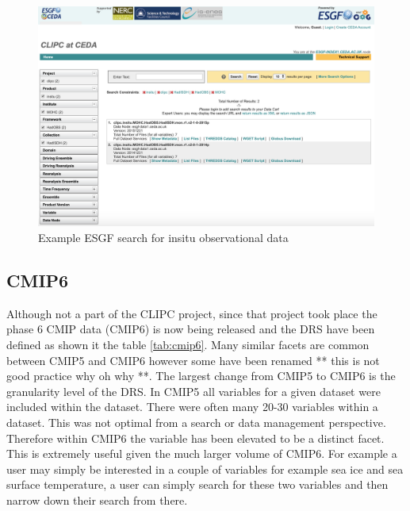\documentclass[final,1p,times,twocolumn,authoryear]{elsarticle}
\begin{document}
{\begin{figure}[ht!] \label{fig:clipc-hadobs}
\centering
\includegraphics[scale=0.4]{images/clipc-esgf-search.png}
\caption{Example ESGF search for insitu observational data}
\end{figure}

\subsection{CMIP6}
Although not a part of the CLIPC project, since that project took place the phase 6 CMIP data (CMIP6) is now being released and the DRS have been defined as shown it the table \ref{tab:cmip6}. Many similar facets are common between CMIP5 and CMIP6 however some have been renamed ** this is not good practice why oh why **. The largest change from CMIP5 to CMIP6 is the granularity level of the DRS. In CMIP5 all variables for a given dataset were included within the dataset. There were often many 20-30 variables within a dataset. This was not optimal from a search or data management perspective. Therefore within CMIP6 the variable has been elevated to be a distinct facet. This is extremely useful given the much larger volume of CMIP6. For example a user may simply be interested in a couple of variables for example sea ice and sea surface temperature, a user can simply search for these two variables and then narrow down their search from there. 

}
\end{document}
